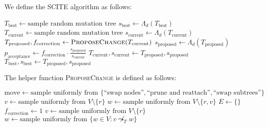 \begin{definition} We define the \ac{SCITE} algorithm as follows:
    \begin{algorithmic}
            \State $T_\mathrm{best} \leftarrow \text{sample random mutation tree}$
            \State $s_\mathrm{best} \leftarrow \Lambda_d(T_\mathrm{best})$
                \State $T_\mathrm{current} \leftarrow \text{sample random mutation tree}$
                \State $s_\mathrm{current} \leftarrow \Lambda_d(T_\mathrm{current})$
                    \State $T_\mathrm{proposed}, f_\mathrm{correction} \leftarrow \textsc{ProposeChange}(T_\mathrm{current})$
                    \State $s_\mathrm{proposed} \leftarrow \Lambda_d(T_\mathrm{proposed})$
                    \State $p_\mathrm{acceptance} \leftarrow f_\mathrm{correction} \cdot \frac{s_\mathrm{proposed}}{s_\mathrm{current}}$
                        \State $T_\mathrm{current}, s_\mathrm{current} \leftarrow T_\mathrm{proposed}, s_\mathrm{proposed}$
                    \EndIf
                        \State $T_\mathrm{best}, s_\mathrm{best} \leftarrow T_\mathrm{proposed}, s_\mathrm{proposed}$
                    \EndIf
                \EndFor
            \EndFor
        \EndFunction
    \end{algorithmic}
    The helper function \textsc{ProposeChange} is defined as follows:
    \begin{algorithmic}
            \State $\mathrm{move} \leftarrow \text{sample uniformly from } \{\text{``swap nodes''}, \text{``prune and reattach''}, \text{``swap subtrees''}\}$
                \State $v \leftarrow \text{sample uniformly from } V \setminus \{r\}$
                \State $w \leftarrow \text{sample uniformly from } V \setminus \{r, v\}$
                \State $E \leftarrow \{\}$
                \State $f_\mathrm{correction} \leftarrow 1$
                \State $v \leftarrow \text{sample uniformly from } V \setminus \{r\}$
                \State $w \leftarrow \text{sample uniformly from } \{w \in V : v \not\leadsto_T w\}$

\end{algorithmic}
\end{definition}
